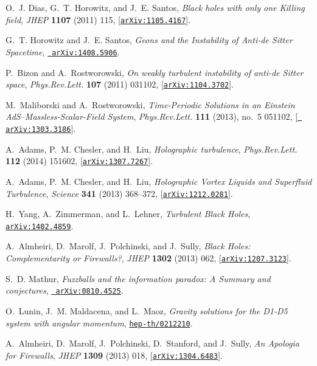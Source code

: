 \documentclass[12pt]{article}
\begin{document}
\begin{thebibliography}{100}
O.~J. Dias, G.~T. Horowitz, and J.~E. Santos, {\it {Black holes with only one
  Killing field}},  {\em JHEP} {\bf 1107} (2011) 115,
  [\href{http://xxx.lanl.gov/abs/1105.4167}{{\tt arXiv:1105.4167}}].

G.~T. Horowitz and J.~E. Santos, {\it {Geons and the Instability of Anti-de
  Sitter Spacetime}},  \href{http://xxx.lanl.gov/abs/1408.5906}{{\tt
  arXiv:1408.5906}}.

P.~Bizon and A.~Rostworowski, {\it {On weakly turbulent instability of anti-de
  Sitter space}},  {\em Phys.Rev.Lett.} {\bf 107} (2011) 031102,
  [\href{http://xxx.lanl.gov/abs/1104.3702}{{\tt arXiv:1104.3702}}].

M.~Maliborski and A.~Rostworowski, {\it {Time-Periodic Solutions in an Einstein
  AdS--Massless-Scalar-Field System}},  {\em Phys.Rev.Lett.} {\bf 111} (2013),
  no.~5 051102, [\href{http://xxx.lanl.gov/abs/1303.3186}{{\tt
  arXiv:1303.3186}}].

A.~Adams, P.~M. Chesler, and H.~Liu, {\it {Holographic turbulence}},  {\em
  Phys.Rev.Lett.} {\bf 112} (2014) 151602,
  [\href{http://xxx.lanl.gov/abs/1307.7267}{{\tt arXiv:1307.7267}}].

A.~Adams, P.~M. Chesler, and H.~Liu, {\it {Holographic Vortex Liquids and
  Superfluid Turbulence}},  {\em Science} {\bf 341} (2013) 368--372,
  [\href{http://xxx.lanl.gov/abs/1212.0281}{{\tt arXiv:1212.0281}}].

H.~Yang, A.~Zimmerman, and L.~Lehner, {\it {Turbulent Black Holes}},
  \href{http://xxx.lanl.gov/abs/1402.4859}{{\tt arXiv:1402.4859}}.

A.~Almheiri, D.~Marolf, J.~Polchinski, and J.~Sully, {\it {Black Holes:
  Complementarity or Firewalls?}},  {\em JHEP} {\bf 1302} (2013) 062,
  [\href{http://xxx.lanl.gov/abs/1207.3123}{{\tt arXiv:1207.3123}}].

S.~D. Mathur, {\it {Fuzzballs and the information paradox: A Summary and
  conjectures}},  \href{http://xxx.lanl.gov/abs/0810.4525}{{\tt
  arXiv:0810.4525}}.

O.~Lunin, J.~M. Maldacena, and L.~Maoz, {\it {Gravity solutions for the D1-D5
  system with angular momentum}},
  \href{http://xxx.lanl.gov/abs/hep-th/0212210}{{\tt hep-th/0212210}}.

A.~Almheiri, D.~Marolf, J.~Polchinski, D.~Stanford, and J.~Sully, {\it {An
  Apologia for Firewalls}},  {\em JHEP} {\bf 1309} (2013) 018,
  [\href{http://xxx.lanl.gov/abs/1304.6483}{{\tt arXiv:1304.6483}}].


\end{thebibliography}
\end{document}
